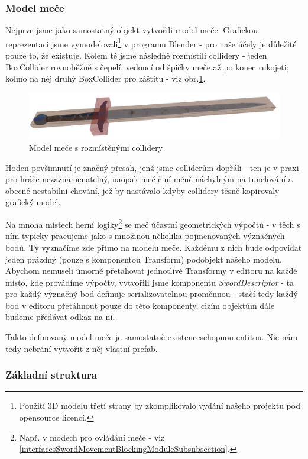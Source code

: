 \subsubsection*{Model meče}

Nejprve jsme jako samostatný objekt vytvořili model meče. Grafickou reprezentaci jsme vymodelovali\footnote{Použití 3D modelu třetí strany by zkomplikovalo vydání našeho projektu pod opensource licencí.} v programu Blender \cite{Blender} - pro naše účely je důležité pouze to, že existuje. Kolem té jsme následně rozmístili collidery - jeden BoxCollider rovnoběžně s čepelí, vedoucí od špičky meče až po konec rukojeti; kolmo na něj druhý BoxCollider pro záštitu - viz obr.\ref{obr05:swordWithColliders}. 
\begin{figure}[ht]\centering
  \center
  \includegraphics[width=120mm]{../img/swordWithColliders.png}
  \caption{Model meče s rozmístěnými collidery}
  \label{obr05:swordWithColliders}
\end{figure} 
Hoden povšimnutí je značný přesah, jenž jsme colliderům dopřáli - ten je v praxi pro hráče nezaznamenatelný, naopak meč činí méně náchylným na tunelování a obecné nestabilní chování, jež by nastávalo kdyby collidery těsně kopírovaly grafický model.  

Na mnoha místech herní logiky\footnote{Např. v modech pro ovládání meče - viz \ref{interfacesSwordMovementBlockingModuleSubsubsection}.} se meč účastní geometrických výpočtů - v těch s ním typicky pracujeme jako s množinou několika pojmenovaných význačných bodů. Ty vyznačíme zde přímo na modelu meče. Každému z nich bude odpovídat jeden prázdný (pouze s komponentou Transform) podobjekt našeho modelu. Abychom nemuseli úmorně přetahovat jednotlivé Transformy v editoru na každé místo, kde provádíme výpočty, vytvořili jsme komponentu \textit{SwordDescriptor} - ta pro každý význačný bod definuje serializovatelnou proměnnou - stačí tedy každý bod v editoru přetáhnout pouze do této komponenty, cizím objektům dále budeme předávat odkaz na ní.

\bigbreak

Takto definovaný model meče je samostatně existenceschopnou entitou. Nic nám tedy nebrání vytvořit z něj vlastní prefab.

\subsubsection*{Základní struktura} 

